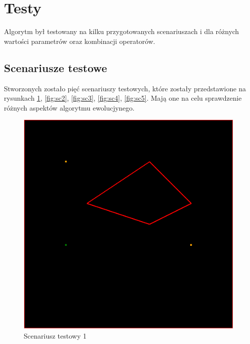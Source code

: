 \documentclass[11pt, leqno]{article}
\begin{document}
\section{Testy}

Algorytm był testowany na kilku przygotowanych scenariuszach i dla różnych wartości parametrów oraz kombinacji operatorów.

\subsection{Scenariusze testowe}
Stworzonych zostało pięć scenariuszy testowych, które zostały przedstawione na rysunkach \ref{fig:sc1}, \ref{fig:sc2}, \ref{fig:sc3}, \ref{fig:sc4}, \ref{fig:sc5}. Mają one na celu sprawdzenie różnych aspektów algorytmu ewolucjynego.


\begin{figure}[h!]
	\centering
	\includegraphics[scale=0.4]{scenario1}
	\caption{Scenariusz testowy 1}
	\label{fig:sc1}
\end{figure}
\end{document}
